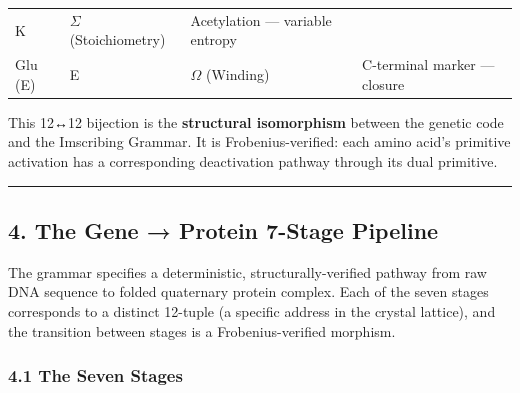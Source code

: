 \begin{longtable}[]{@{}llll@{}}
\begin{minipage}[t]{0.17\columnwidth}
K\strut
\end{minipage} & \begin{minipage}[t]{0.36\columnwidth}\raggedright
\(\Sigma\) (Stoichiometry)\strut
\end{minipage} & \begin{minipage}[t]{0.15\columnwidth}\raggedright
Acetylation --- variable entropy\strut
\end{minipage}\tabularnewline
\begin{minipage}[t]{0.20\columnwidth}\raggedright
Glu (E)\strut
\end{minipage} & \begin{minipage}[t]{0.17\columnwidth}\raggedright
E\strut
\end{minipage} & \begin{minipage}[t]{0.36\columnwidth}\raggedright
\(\Omega\) (Winding)\strut
\end{minipage} & \begin{minipage}[t]{0.15\columnwidth}\raggedright
C-terminal marker --- closure\strut
\end{minipage}\tabularnewline
\bottomrule
\end{longtable}

This 12↔12 bijection is the \textbf{structural isomorphism} between the
genetic code and the Imscribing Grammar. It is Frobenius-verified: each
amino acid's primitive activation has a corresponding deactivation
pathway through its dual primitive.

\begin{center}\rule{0.5\linewidth}{0.5pt}\end{center}

\hypertarget{the-gene-protein-7-stage-pipeline}{%
\subsection{4. The Gene → Protein 7-Stage
Pipeline}\label{the-gene-protein-7-stage-pipeline}}

The grammar specifies a deterministic, structurally-verified pathway
from raw DNA sequence to folded quaternary protein complex. Each of the
seven stages corresponds to a distinct 12-tuple (a specific address in
the crystal lattice), and the transition between stages is a
Frobenius-verified morphism.

\hypertarget{the-seven-stages}{%
\subsubsection{4.1 The Seven Stages}\label{the-seven-stages}}

